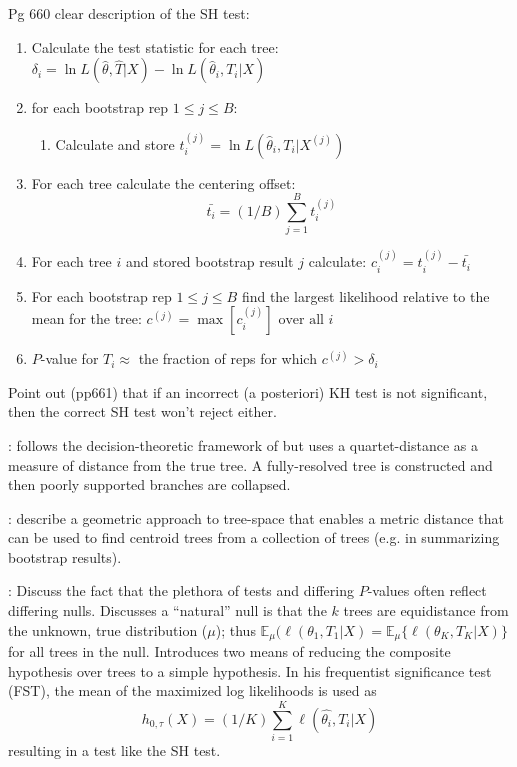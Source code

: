 \documentclass[11pt]{article}
\newcommand{\boot}[1]{X^{(#1)}}
\newcommand{\like}{\ell}
\newcommand{\expectation}{{\mathbb{E}}}
\newcommand{\pvalue}{$P$-value\xspace}
\newcommand{\pvalues}{$P$-values\xspace}
\begin{document}
Pg 660 clear description of the SH test:
\begin{enumerate}
	\item Calculate the test statistic for each tree: $\delta_i = \ln L(\hat\theta,\hat{T}|X) - \ln L(\hat\theta_i, T_i|X)$
	\item for each bootstrap rep $1 \leq j \leq B$:
	\begin{enumerate}
		\item Calculate and store $t_i^{(j)} = \ln L(\hat\theta_i, T_i|\boot{j})$
	\end{enumerate}
	\item For each tree calculate the centering offset: $$\bar{t_i} = (1/B)\sum_{j=1}^Bt_i^{(j)}$$
	\item For each tree $i$ and stored bootstrap result $j$ calculate: ${c_i^{(j)}} = t_i^{(j)} - \bar{t_i}$
	\item For each bootstrap rep $1 \leq j \leq B$ find the largest likelihood relative to the mean for the tree: $c^{(j)} = \max\left[c_i^{(j)}\right] \mbox{ over all } i$
	\item \pvalue for $T_i\approx$ the fraction of reps for which $c^{(j)} > \delta_i$
\end{enumerate}

Point out (pp661) that if an incorrect (a posteriori) KH test is not significant, then the correct SH test won't reject either.


\citet{BerryGC2000}: follows the decision-theoretic framework of \citet{BerryG1996} but uses a quartet-distance as a measure of distance from the true tree. A fully-resolved tree is constructed and then poorly supported branches are collapsed.

\citet{BilleraHV2001}: describe a geometric approach to tree-space that enables a metric distance that can be used to find centroid trees from a collection of trees (e.g. in summarizing bootstrap results).

\citet{ArisBrosou2003}: Discuss the fact that the plethora of tests and differing \pvalues often reflect differing nulls.  Discusses a ``natural'' null is that the $k$ trees are equidistance from the unknown, true distribution ($\mu$); thus $\expectation_{\mu}(\like(\theta_1,T_1|X) = \expectation_{\mu}\{\like(\theta_K,T_K|X)\}$ for all trees in the null.  Introduces two means of reducing the composite hypothesis over trees to a simple hypothesis.
In his frequentist significance test (FST), the mean of the maximized log likelihoods is used as $$h_{0,\tau}(X) = (1/K)\sum_{i=1}^K \like(\hat{\theta_i},T_i|X)$$
resulting in a test like the SH test.
\end{document}
